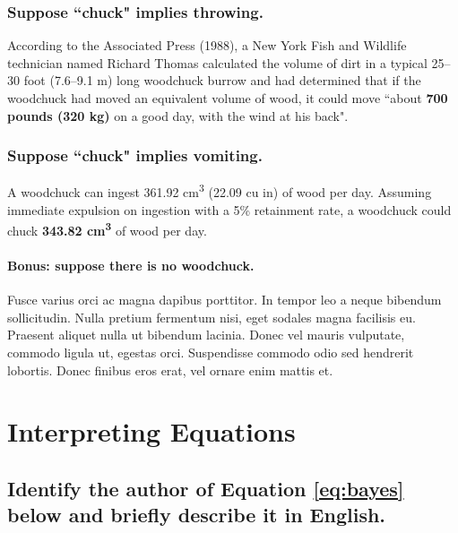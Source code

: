 \documentclass[11pt]{scrartcl} %
\begin{document}
\subsubsection{Suppose ``chuck" implies throwing.}

According to the Associated Press (1988), a New York Fish and Wildlife technician named Richard Thomas calculated the volume of dirt in a typical 25--30 foot (7.6--9.1 m) long woodchuck burrow and had determined that if the woodchuck had moved an equivalent volume of wood, it could move ``about \textbf{700 pounds (320 kg)} on a good day, with the wind at his back".


\subsubsection{Suppose ``chuck" implies vomiting.}

A woodchuck can ingest 361.92 cm\textsuperscript{3} (22.09 cu in) of wood per day. Assuming immediate expulsion on ingestion with a 5\% retainment rate, a woodchuck could chuck \textbf{343.82 cm\textsuperscript{3}} of wood per day.


\paragraph{Bonus: suppose there is no woodchuck.}

Fusce varius orci ac magna dapibus porttitor. In tempor leo a neque bibendum sollicitudin. Nulla pretium fermentum nisi, eget sodales magna facilisis eu. Praesent aliquet nulla ut bibendum lacinia. Donec vel mauris vulputate, commodo ligula ut, egestas orci. Suspendisse commodo odio sed hendrerit lobortis. Donec finibus eros erat, vel ornare enim mattis et.


\section{Interpreting Equations}

\subsection{Identify the author of Equation \ref{eq:bayes} below and briefly describe it in English.}
\end{document}
